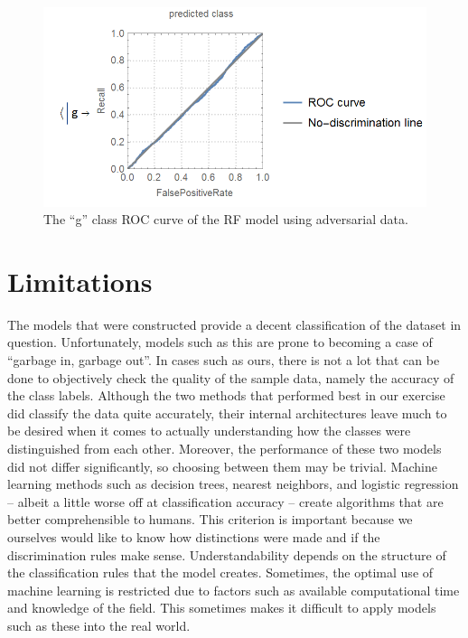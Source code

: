\documentclass[a4paper, 12pt]{report}
\theoremstyle{definition}
\begin{document}
\begin{figure}[h!]
    \centering
    \includegraphics[scale=0.42]{im/testonrf.png}
    \caption{The \enquote{g} class ROC curve of the RF model using adversarial data.}
    \label{fig:testrf}
\end{figure}

\newpage

\section{Limitations}

The models that were constructed provide a decent classification of the dataset in question. Unfortunately, models such as this are prone to becoming a case of \enquote{garbage in, garbage out}. In cases such as ours, there is not a lot that can be done to objectively check the quality of the sample data, namely the accuracy of the class labels. Although the two methods that performed best in our exercise did classify the data quite accurately, their internal architectures leave much to be desired when it comes to actually understanding how the classes were distinguished from each other. Moreover, the performance of these two models did not differ significantly, so choosing between them may be trivial. Machine learning methods such as decision trees, nearest neighbors, and logistic regression -- albeit a little worse off at classification accuracy -- create algorithms that are better comprehensible to humans. This criterion is important because we ourselves would like to know how distinctions were made and if the discrimination rules make sense. Understandability depends on the structure of the classification rules that the model creates. Sometimes, the optimal use of machine learning is restricted due to factors such as available computational time and knowledge of the field. This sometimes makes it difficult to apply models such as these into the real world.
\end{document}
